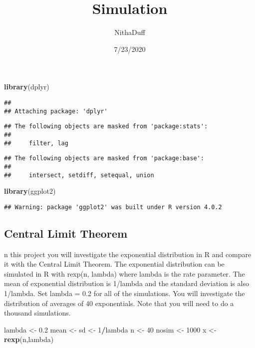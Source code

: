 \documentclass[
]{article}
\title{Simulation}
\author{NithaDuff}
\date{7/23/2020}
\newenvironment{Shaded}{\begin{snugshade}}{\end{snugshade}}
\newcommand{\DecValTok}[1]{\textcolor[rgb]{0.00,0.00,0.81}{#1}}
\newcommand{\FloatTok}[1]{\textcolor[rgb]{0.00,0.00,0.81}{#1}}
\newcommand{\KeywordTok}[1]{\textcolor[rgb]{0.13,0.29,0.53}{\textbf{#1}}}
\newcommand{\NormalTok}[1]{#1}
\newcommand{\OperatorTok}[1]{\textcolor[rgb]{0.81,0.36,0.00}{\textbf{#1}}}
\newcommand{\StringTok}[1]{\textcolor[rgb]{0.31,0.60,0.02}{#1}}
\begin{document}
\maketitle

\begin{Shaded}
\begin{Highlighting}[]
\KeywordTok{library}\NormalTok{(dplyr)}
\end{Highlighting}
\end{Shaded}

\begin{verbatim}
## 
## Attaching package: 'dplyr'
\end{verbatim}

\begin{verbatim}
## The following objects are masked from 'package:stats':
## 
##     filter, lag
\end{verbatim}

\begin{verbatim}
## The following objects are masked from 'package:base':
## 
##     intersect, setdiff, setequal, union
\end{verbatim}

\begin{Shaded}
\begin{Highlighting}[]
\KeywordTok{library}\NormalTok{(ggplot2)}
\end{Highlighting}
\end{Shaded}

\begin{verbatim}
## Warning: package 'ggplot2' was built under R version 4.0.2
\end{verbatim}

\hypertarget{central-limit-theorem}{%
\subsection{Central Limit Theorem}\label{central-limit-theorem}}

n this project you will investigate the exponential distribution in R
and compare it with the Central Limit Theorem. The exponential
distribution can be simulated in R with rexp(n, lambda) where lambda is
the rate parameter. The mean of exponential distribution is 1/lambda and
the standard deviation is also 1/lambda. Set lambda = 0.2 for all of the
simulations. You will investigate the distribution of averages of 40
exponentials. Note that you will need to do a thousand simulations.

\begin{Shaded}
\begin{Highlighting}[]
\NormalTok{lambda <-}\StringTok{ }\FloatTok{0.2}
\NormalTok{mean <-}\StringTok{ }\NormalTok{sd <-}\StringTok{  }\DecValTok{1}\OperatorTok{/}\NormalTok{lambda}
\NormalTok{n <-}\StringTok{ }\DecValTok{40}
\NormalTok{nosim <-}\StringTok{ }\DecValTok{1000}
\NormalTok{x <-}\StringTok{ }\KeywordTok{rexp}\NormalTok{(n,lambda)}
\end{Highlighting}
\end{Shaded}
\end{document}
